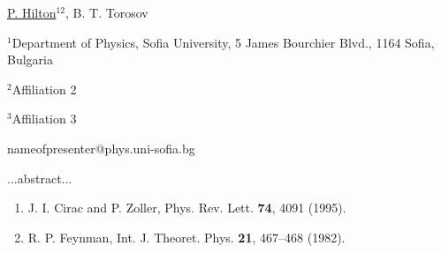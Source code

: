 \title{}

\underline{P. Hilton}$^{12}$, B. T. Torosov$^{}$  

{\normalsize{

\vspace{-4mm} $^1$Department of Physics, Sofia University, 5 James
Bourchier Blvd., 1164 Sofia, Bulgaria

\vspace{-4mm} $^2$Affiliation 2

\vspace{-4mm} $^3$Affiliation 3

\email nameofpresenter@phys.uni-sofia.bg}}

...abstract...

\begin{enumerate}
\item J. I. Cirac and P. Zoller, Phys. Rev. Lett. \textbf{74}, 4091 (1995).
\item R. P. Feynman, Int. J. Theoret. Phys. \textbf{21}, 467--468 (1982).
\end{enumerate}

\vspace{\baselineskip} 